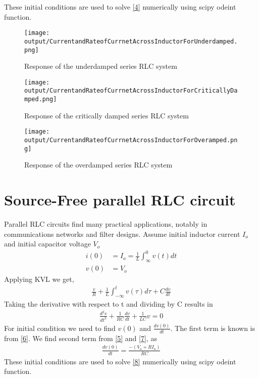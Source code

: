 \documentclass[11pt,a4paper]{article}
\begin{document}
These initial conditions are used to solve \ref{4} numerically using scipy odeint function.

\begin{figure}[H]
\texttt{[image: output/CurrentandRateofCurrnetAcrossInductorForUnderdamped.png]}
\caption{Response of the underdamped series RLC system }
\centering
\end{figure}

\begin{figure}[H]
\texttt{[image: output/CurrentandRateofCurrnetAcrossInductorForCriticallyDamped.png]}
\caption{Response of the critically damped series RLC system }
\centering
\end{figure}

\begin{figure}[H]
\texttt{[image: output/CurrentandRateofCurrnetAcrossInductorForOveramped.png]}
\caption{Response of the overdamped series RLC system }
\centering
\end{figure}

\section{Source-Free parallel RLC circuit \cite{Alexander}}
Parallel RLC circuits find many practical applications, notably in communications networks and filter designs.
Assume initial inductor current $I_o$ and initial capacitor voltage $V_o$ 
\begin{align}
i(0) &= I_o = \frac{1}{L}\int_{\infty}^{0}v(t)dt \label{5}\\
v(0) &= V_o \label{6}
\end{align}
Applying KVL we get,
 \begin{align}
 \frac{v}{R} + \frac{1}{L}\int_{-\infty}^tv(\tau)d\tau + C\frac{dv}{dt} \label{7}
 \end{align}
 Taking the derivative with respect to t and dividing by C results in
 \begin{align}
 \frac{d^2v}{dt^2} + \frac{1}{RC}\frac{dv}{dt} + \frac{1}{LC}v =0 \label{8}
 \end{align}
 For initial condition we need to find $v(0)$ and $\frac{dv(0)}{dt}$. The first term is known is from \ref{6}.
 We find second term from \ref{5} and \ref{7}, as
 \begin{align}
 \frac{dv(0)}{dt} = \frac{-(V_o+RI_o)}{RC}
 \end{align}
 These initial conditions are used to solve \ref{8} numerically using scipy odeint function.
 
\end{document}
